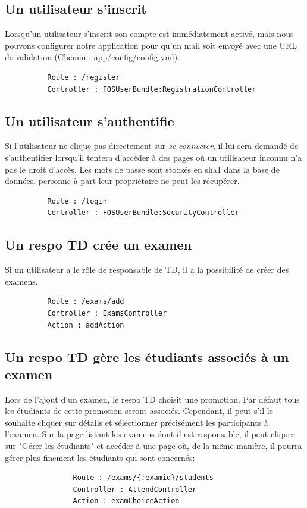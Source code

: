 \documentclass{report}
\begin{document}
       \subsection{Un utilisateur s'inscrit}
        Lorsqu’un utilisateur s’inscrit son compte est immédiatement activé, mais
        nous pouvons configurer notre application pour qu’un mail soit envoyé avec une
        URL de validation (Chemin : app/config/config.yml).
        \begin{verbatim}
          Route : /register 
          Controller : FOSUserBundle:RegistrationController
        \end{verbatim}

      \subsection{Un utilisateur s'authentifie}
        Si l'utilisateur ne clique pas directement sur \textsl{se connecter}, il lui sera demandé
        de s'authentifier lorsqu'il tentera d'accéder à des pages où un utilisateur inconnu
        n'a pas le droit d'accès. Les mots de passe sont stockés en sha1 dans la base de données,
        personne à part leur propriétaire ne peut les récupérer.
        \begin{verbatim}
          Route : /login 
          Controller : FOSUserBundle:SecurityController
        \end{verbatim}

      \subsection{Un respo TD crée un examen}
        Si un utilisateur a le rôle de responsable de TD, il a la possibilité
        de créer des examens.        
        \begin{verbatim}
          Route : /exams/add
          Controller : ExamsController
          Action : addAction
        \end{verbatim}

      \subsection{Un respo TD gère les étudiants associés à un examen}
          Lors de l'ajout d'un examen, le respo TD choisit une promotion. Par défaut
          tous les étudiants de cette promotion seront associés. Cependant, il peut
          s'il le souhaite cliquer sur détails et sélectionner 
          précisément les participants à l'examen.
          Sur la page listant les examens dont il est responsable, il peut
          cliquer sur "Gérer les étudiants" et accéder à une page où,
          de la même manière, il pourra gérer plus finement les
          étudiants qui sont concernés:
              \vspace{1em}
              \begin{verbatim}
                Route : /exams/{:examid}/students
                Controller : AttendController
                Action : examChoiceAction
              \end{verbatim}
\end{document}
